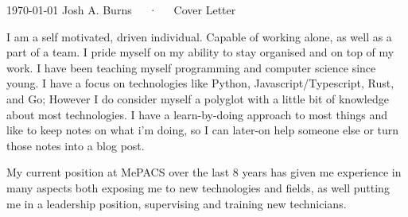 \documentclass[11pt, a4paper]{awesome-cv}
\begin{document}
\makecvheader[R]

\makecvfooter
  {\today}
  {Josh A. Burns~~~·~~~Cover Letter}
  {}


\begin{cvletter}

I am a self motivated, driven individual. Capable of working alone, as well as a part of a team. I pride myself on my ability to stay organised and on top of my work. 
I have been teaching myself programming and computer science since young. I have a focus on technologies like Python, Javascript/Typescript, Rust, and Go; However
I do consider myself a polyglot with a little bit of knowledge about most technologies.
I have a learn-by-doing approach to most things and like to keep notes on what i'm doing, so I can later-on help someone else or turn those notes into a blog post. 

My current position at MePACS over the last 8 years has given me experience in many aspects both exposing me to new technologies and 
fields, as well putting me in a leadership position, supervising and training new technicians.
\end{cvletter}


\makeletterclosing
\end{document}
